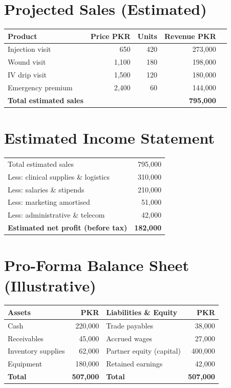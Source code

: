 \documentclass[12pt,a4paper]{report}
\begin{document}
\section{Projected Sales (Estimated)}
\begin{tabular}{@{}lrrrr@{}}
\toprule
\textbf{Product} & \textbf{Price PKR} & \textbf{Units} & \textbf{Revenue PKR} \\
\midrule
Injection visit & 650 & 420 & 273{,}000 \\
Wound visit & 1{,}100 & 180 & 198{,}000 \\
IV drip visit & 1{,}500 & 120 & 180{,}000 \\
Emergency premium & 2{,}400 & 60 & 144{,}000 \\
\midrule
\textbf{Total estimated sales} & & & \textbf{795{,}000} \\
\bottomrule
\end{tabular}

\section{Estimated Income Statement}
\begin{tabular}{@{}l r@{}}
\toprule
Total estimated sales & 795{,}000 \\
Less: clinical supplies \& logistics & 310{,}000 \\
Less: salaries \& stipends & 210{,}000 \\
Less: marketing amortised & 51{,}000 \\
Less: administrative \& telecom & 42{,}000 \\
\midrule
\textbf{Estimated net profit (before tax)} & \textbf{182{,}000} \\
\bottomrule
\end{tabular}

\section{Pro-Forma Balance Sheet (Illustrative)}
\begin{tabular}{@{}p{6cm}r p{6cm}r@{}}
\toprule
\textbf{Assets} & \textbf{PKR} & \textbf{Liabilities \& Equity} & \textbf{PKR} \\
\midrule
Cash & 220{,}000 & Trade payables & 38{,}000 \\
Receivables & 45{,}000 & Accrued wages & 27{,}000 \\
Inventory supplies & 62{,}000 & Partner equity (capital) & 400{,}000 \\
Equipment & 180{,}000 & Retained earnings & 42{,}000 \\
\midrule
\textbf{Total} & \textbf{507{,}000} & \textbf{Total} & \textbf{507{,}000} \\
\bottomrule
\end{tabular}
\end{document}
